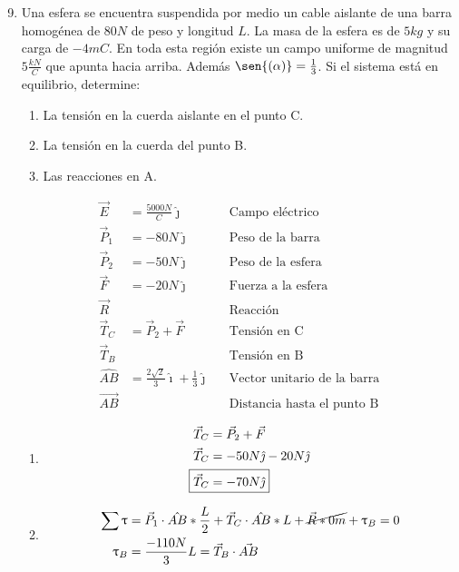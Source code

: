 \documentclass[12pt, twoside]{article}
\begin{document}
\begin{enumerate}
	\setcounter{enumi}{8}
	\item Una esfera se encuentra suspendida por medio un cable aislante
		de una barra homogénea de $80N$ de peso y longitud $L$.
		La masa de la esfera es de $5kg$ y su carga de $-4mC$.
		En toda esta región existe un campo uniforme de magnitud $5 \frac{kN}{C}$
		que apunta hacia arriba.
		Además $\sen{(\alpha)}=\frac{1}{3}$.
		Si el sistema está en equilibrio, determine:
		\begin{enumerate}
			\item La tensión en la cuerda aislante en el punto C.

			\item La tensión en la cuerda del punto B.

			\item Las reacciones en A.
		\end{enumerate}
		\begin{align*}
			\vec{E} &= \frac{5000N}{C} \hat{\jmath} && \text{Campo eléctrico}\\
			\vec{P}_1 &= -80N\hat{\jmath} && \text{Peso de la barra}\\
			\vec{P}_2 &= -50N\hat{\jmath} && \text{Peso de la esfera}\\
			\vec{F} &= -20N \hat{\jmath} && \text{Fuerza a la esfera}\\
			\vec{R} & && \text{Reacción}\\
			\vec{T}_C &= \vec{P}_2 + \vec{F} && \text{Tensión en C}\\
			\vec{T}_B & && \text{Tensión en B}\\
			\hat{AB} &= \frac{2\sqrt{2}}{3} \hat{\imath}+
			\frac{1}{3} \hat{\jmath} && \text{Vector unitario de la barra}\\
			\vec{AB} & && \text{Distancia hasta el punto B}
		\end{align*}

		\begin{enumerate}
			\item
				\begin{align*}
					\vec{T}_C &= \vec{P}_2 + \vec{F}\\
					\vec{T}_C &= -50N\hat{\jmath}-20N\hat{\jmath}\\
					\Aboxed
					{
						\vec{T}_C &= -70N\hat{\jmath}
					}
				\end{align*}
			\item
				\begin{align*}
					\sum \uptau &= \vec{P}_1\cdot\hat{AB}* \frac{L}{2}+
					\vec{T}_C\cdot\hat{AB}*L+
					\cancel{\vec{R}*0m}+
					\uptau_B=0\\
					\uptau_B &= \frac{-110N}{3}L = \vec{T}_B \cdot\vec{AB}
				\end{align*}
		\end{enumerate}
\end{enumerate}
\end{document}

